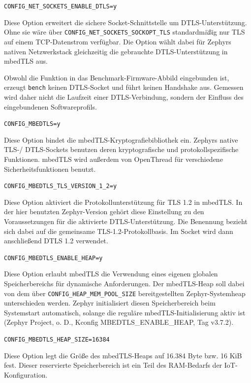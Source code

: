 \lstinline[style=fileinline]|CONFIG_NET_SOCKETS_ENABLE_DTLS=y|

Diese Option erweitert die sichere Socket-Schnittstelle um DTLS-Unterst{\"u}tzung. Ohne sie w{\"a}re {\"u}ber \lstinline[style=fileinline]|CONFIG_NET_SOCKETS_SOCKOPT_TLS| standardm{\"a}{\ss}ig nur TLS auf einem TCP-Datenstrom verf{\"u}gbar. Die Option w{\"a}hlt dabei f{\"u}r Zephyrs nativen Netzwerkstack gleichzeitig die gebrauchte DTLS-Unterst{\"u}tzung in mbedTLS aus.

Obwohl die Funktion in das Benchmark-Firmware-Abbild eingebunden ist, erzeugt \lstinline[style=fileinline]|bench| keinen DTLS-Socket und f{\"u}hrt keinen Handshake aus. Gemessen wird daher nicht die Laufzeit einer DTLS-Verbindung, sondern der Einfluss des eingebundenen Softwareprofils.

\lstinline[style=fileinline]|CONFIG_MBEDTLS=y|

Diese Option bindet die mbedTLS-Kryptografiebibliothek ein. Zephyrs native TLS-/ DTLS-Sockets benutzen deren kryptografische und protokollspezifische Funktionen. mbedTLS wird au{\ss}erdem von OpenThread f{\"u}r verschiedene Sicherheitsfunktionen benutzt.

\lstinline[style=fileinline]|CONFIG_MBEDTLS_TLS_VERSION_1_2=y|

Diese Option aktiviert die Protokollunterst{\"u}tzung f{\"u}r TLS 1.2 in mbedTLS. In der hier benutzten Zephyr-Version geh{\"o}rt diese Einstellung zu den Voraussetzungen f{\"u}r die aktivierte DTLS-Unterst{\"u}tzung. Die Benennung bezieht sich dabei auf die gemeinsame TLS-1.2-Protokollbasis. Im Socket wird dann anschlie{\ss}end DTLS 1.2 verwendet.

\lstinline[style=fileinline]|CONFIG_MBEDTLS_ENABLE_HEAP=y|

Diese Option erlaubt mbedTLS die Verwendung eines eigenen globalen Speicherbereichs f{\"u}r dynamische Anforderungen. Der mbedTLS-Heap soll dabei von dem {\"u}ber \lstinline[style=fileinline]|CONFIG_HEAP_MEM_POOL_SIZE| bereitgestellten Zephyr-Systemheap unterschieden werden. Zephyr initialisiert diesen Speicherbereich beim Systemstart automatisch, solange die regul{\"a}re mbedTLS-Initialisierung aktiv ist (Zephyr Project, o. D., Kconfig MBEDTLS\_ENABLE\_HEAP, Tag v3.7.2).

\lstinline[style=fileinline]|CONFIG_MBEDTLS_HEAP_SIZE=16384|

Diese Option legt die Gr{\"o}{\ss}e des mbedTLS-Heaps auf 16.384 Byte bzw. 16 KiB fest. Dieser reservierte Speicherbereich ist ein Teil des RAM-Bedarfs der IoT-Konfiguration.

